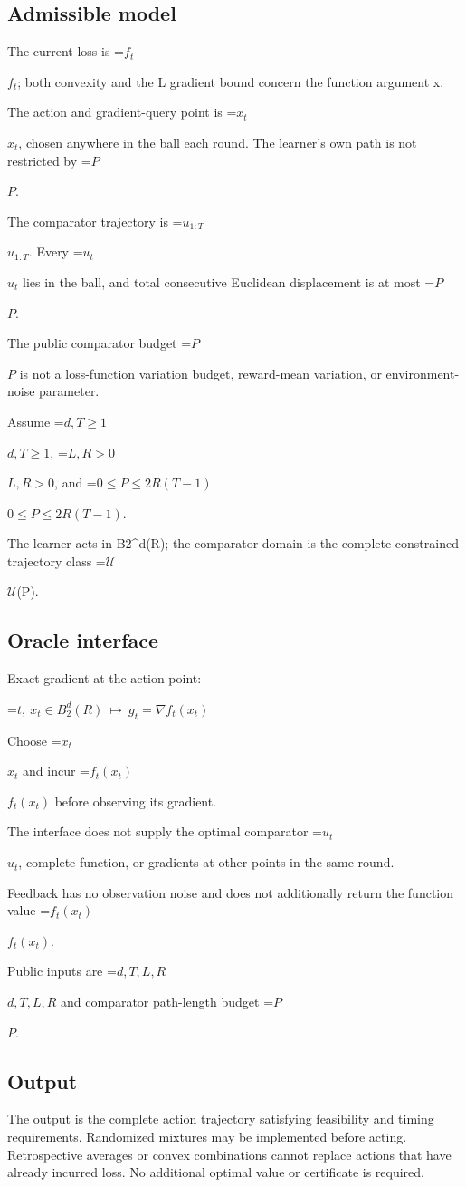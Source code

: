 \documentclass[10pt,a4paper]{article}
\newcommand{\AtlasMath}[1]{\par\begingroup\centering\setbox0=\hbox{$\displaystyle #1$}\ifdim\wd0>1.4\linewidth\typeout{ATLAS WIDE FORMULA: \the\wd0}\fi\ifdim\wd0>\linewidth\resizebox{\linewidth}{!}{\box0}\else\box0\fi\par\endgroup}
\newcommand{\AtlasInlineMath}[1]{\begingroup\setbox0=\hbox{$#1$}\ifdim\wd0>.4\linewidth\endgroup\AtlasMath{#1}\else\endgroup$#1$\fi}
\begin{document}
\subsection{Admissible model}
The current loss is \AtlasInlineMath{f_t}; both convexity and the L gradient bound concern the function argument x.

The action and gradient-query point is \AtlasInlineMath{x_t}, chosen anywhere in the ball each round. The learner's own path is not restricted by \AtlasInlineMath{P}.

The comparator trajectory is \AtlasInlineMath{u_{1:T}}. Every \AtlasInlineMath{u_t} lies in the ball, and total consecutive Euclidean displacement is at most \AtlasInlineMath{P}.

The public comparator budget \AtlasInlineMath{P} is not a loss-function variation budget, reward-mean variation, or environment-noise parameter.

Assume \AtlasInlineMath{d,T\ge1}, \AtlasInlineMath{L,R>0}, and \AtlasInlineMath{0\le P\le2R(T-1)}.

The learner acts in B2\textasciicircum{}d(R); the comparator domain is the complete constrained trajectory class \AtlasInlineMath{\mathcal{U}}(P).

\subsection{Oracle interface}
Exact gradient at the action point:


\AtlasMath{t,\ x_t\in B_2^d(R)\ \longmapsto\ g_t=\nabla f_t(x_t)}


Choose \AtlasInlineMath{x_t} and incur \AtlasInlineMath{f_t(x_t)} before observing its gradient.

The interface does not supply the optimal comparator \AtlasInlineMath{u_t}, complete function, or gradients at other points in the same round.

Feedback has no observation noise and does not additionally return the function value \AtlasInlineMath{f_t(x_t)}.

Public inputs are \AtlasInlineMath{d,T,L,R} and comparator path-length budget \AtlasInlineMath{P}.

\subsection{Output}
The output is the complete action trajectory satisfying feasibility and timing requirements. Randomized mixtures may be implemented before acting. Retrospective averages or convex combinations cannot replace actions that have already incurred loss. No additional optimal value or certificate is required.
\end{document}
